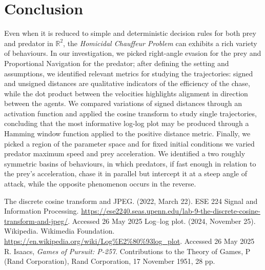 \documentclass[10pt, twocolumn]{article}
\begin{document}
          \section{Conclusion}
          Even when it is reduced to simple and deterministic decision rules for both prey and predator in $\mathbb{R}^2$, the \textit{Homicidal Chauffeur Problem} can exhibits a rich variety of behaviours. In our investigation, we picked right-angle evasion for the prey and Proportional Navigation for the predator; after defining the setting and assumptions, we identified relevant metrics for studying the trajectories: signed and unsigned distances are qualitative indicators of the efficiency of the chase, while the dot product between the velocities highlights alignment in direction between the agents. We compared variations of signed distances through an activation function and applied the cosine transform to study single trajectories, concluding that the most informative log-log plot may be produced through a Hamming window function applied to the positive distance metric. Finally, we picked a region of the parameter space and for fixed initial conditions we varied predator maximum speed and prey acceleration. We identified a two roughly symmetric basins of behaviours, in which predators, if fast enough in relation to the prey's acceleration, chase it in parallel but intercept it at a steep angle of attack, while the opposite phenomenon occurs in the reverse.

          \begin{thebibliography}{99}
             The discrete cosine transform and JPEG. (2022, March 22). ESE 224 Signal and Information Processing. \url{https://ese2240.seas.upenn.edu/lab-9-the-discrete-cosine-transform-and-jpeg/}. Accessed 26 May 2025
             Log–log plot. (2024, November 25). Wikipedia. Wikimedia Foundation. \url{https://en.wikipedia.org/wiki/Log%E2%80%93log_plot}. Accessed 26 May 2025
               R. Isaacs, \emph{Games of Pursuit: P-257}. Contributions to the Theory of Games, P (Rand Corporation), Rand Corporation, 17 November 1951, 28 pp.
            \end{thebibliography}
            
\end{document}
